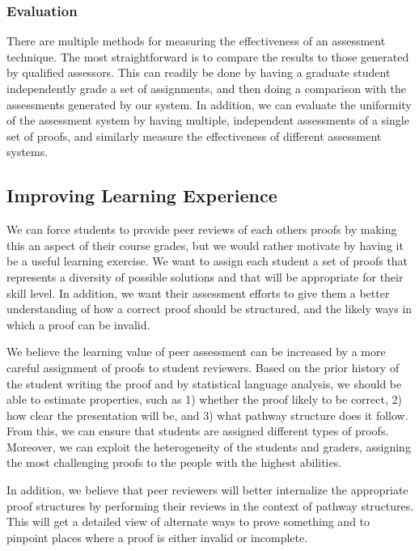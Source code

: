 \documentclass[12pt]{article}
\begin{document}
\subsubsection*{Evaluation}

There are multiple methods for measuring the effectiveness of an
assessment technique.  The most straightforward is to compare the
results to those generated by qualified assessors.  This can readily
be done by having a graduate student independently grade a set of
assignments, and then doing a comparison with the assessments
generated by our system.  In addition, we can evaluate the uniformity
of the assessment system by having multiple, independent assessments
of a single set of proofs, and similarly measure the effectiveness of
different assessment systems.

\subsection{Improving Learning Experience}

We can force students to provide peer reviews of each others proofs
by making this an aspect of their course grades, but we would
rather motivate by having it be a useful learning exercise.  We 
want to assign each student a set of proofs that represents a
diversity of possible solutions and that will be appropriate for their
skill level.  In addition, we want their assessment efforts to give
them a better understanding of how a correct proof should be
structured, and the likely ways in which a proof can be invalid.

We believe the learning value of peer assessment can be increased by a
more careful assignment of proofs to student reviewers.  Based on the
prior history of the student writing the proof and by statistical
language analysis, we should be able to estimate properties, such as
1) whether the proof likely to be correct, 2) how clear the presentation
will be, and 3) what pathway structure does it follow.  From this, we
can ensure that students are assigned different types of proofs.
Moreover, we can exploit the heterogeneity of the students and
graders, assigning the most challenging proofs to the people with the
highest abilities.

In addition, we believe that peer reviewers will better internalize
the appropriate proof structures by performing their reviews in the
context of pathway structures.  This will get a detailed view of
alternate ways to prove something and to pinpoint places where
a proof is either invalid or incomplete.
\end{document}
